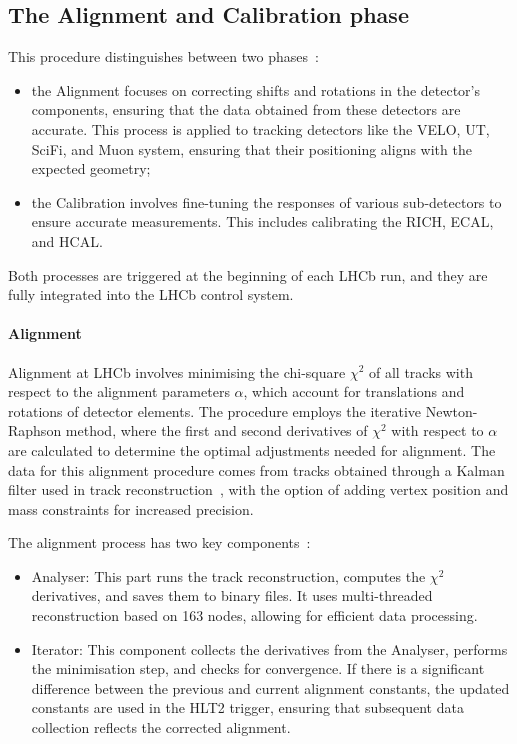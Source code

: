 \subsection{The Alignment and Calibration phase}\label{sec:alignment}
This procedure distinguishes between two phases~\cite{Dziurda:2640712}:
\begin{itemize}
\item the Alignment focuses on correcting shifts and rotations in the detector's components, ensuring that the data obtained from these detectors are accurate. This process is applied to tracking detectors like the VELO, UT, SciFi, and Muon system, ensuring that their positioning aligns with the expected geometry;
\item the Calibration involves fine-tuning the responses of various sub-detectors to ensure accurate measurements. This includes calibrating the RICH, ECAL, and HCAL.
\end{itemize}
Both processes are triggered at the beginning of each LHCb run, and they are fully integrated into the LHCb control system. 
\paragraph{Alignment}
Alignment at LHCb involves minimising the chi-square $\chi^2$ of all tracks with respect to the alignment parameters $\alpha$, which account for translations and rotations of detector elements. The procedure employs the iterative Newton-Raphson method\cite{raphson2011analysis}, where the first and second derivatives of $\chi^2$ with respect to $\alpha$ are calculated to determine the optimal adjustments needed for alignment. The data for this alignment procedure comes from tracks obtained through a Kalman filter used in track reconstruction~\cite{HULSBERGEN2009471}, with the option of adding vertex position and mass constraints for increased precision.

The alignment process has two key components~\cite{Saur:20230E}:
\begin{itemize}
\item Analyser: This part runs the track reconstruction, computes the $\chi^2$ derivatives, and saves them to binary files. It uses multi-threaded reconstruction based on 163 nodes, allowing for efficient data processing.
\item Iterator: This component collects the derivatives from the Analyser, performs the minimisation step, and checks for convergence. If there is a significant difference between the previous and current alignment constants, the updated constants are used in the HLT2 trigger, ensuring that subsequent data collection reflects the corrected alignment.
\end{itemize}


